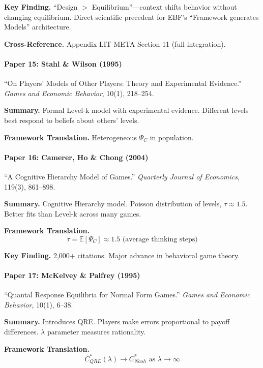 \textbf{Key Finding.}
``Design $>$ Equilibrium''---context shifts behavior without changing equilibrium.
Direct scientific precedent for EBF's ``Framework generates Models'' architecture.

\textbf{Cross-Reference.} Appendix LIT-META Section 11 (full integration).

\paragraph{Paper 15: Stahl \& Wilson (1995)}

``On Players' Models of Other Players: Theory and Experimental Evidence.''
\textit{Games and Economic Behavior}, 10(1), 218--254.

\textbf{Summary.}
Formal Level-k model with experimental evidence. Different levels best 
respond to beliefs about others' levels.

\textbf{Framework Translation.}
Heterogeneous $\Psi_C$ in population.

\paragraph{Paper 16: Camerer, Ho \& Chong (2004)}

``A Cognitive Hierarchy Model of Games.''
\textit{Quarterly Journal of Economics}, 119(3), 861--898.

\textbf{Summary.}
Cognitive Hierarchy model. Poisson distribution of levels, $\tau \approx 1.5$.
Better fits than Level-k across many games.

\textbf{Framework Translation.}
\begin{equation}
\tau = \mathbb{E}[\Psi_C] \approx 1.5 \text{ (average thinking steps)}
\end{equation}

\textbf{Key Finding.}
2,000+ citations. Major advance in behavioral game theory.

\paragraph{Paper 17: McKelvey \& Palfrey (1995)}

``Quantal Response Equilibria for Normal Form Games.''
\textit{Games and Economic Behavior}, 10(1), 6--38.

\textbf{Summary.}
Introduces QRE. Players make errors proportional to payoff differences.
$\lambda$ parameter measures rationality.

\textbf{Framework Translation.}
\begin{equation}
C^*_{QRE}(\lambda) \to C^*_{Nash} \text{ as } \lambda \to \infty
\end{equation}

